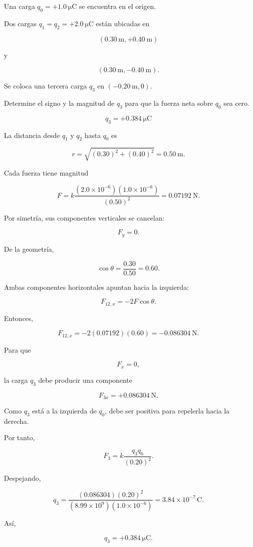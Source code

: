 \begin{ejercicio}
Una carga \(q_0=+\SI{1.0}{\micro\coulomb}\) se encuentra en el origen.

Dos cargas \(q_1=q_2=+\SI{2.0}{\micro\coulomb}\) están ubicadas en

\[
(\SI{0.30}{\metre},+\SI{0.40}{\metre})
\]

y

\[
(\SI{0.30}{\metre},-\SI{0.40}{\metre}).
\]

Se coloca una tercera carga \(q_3\) en
\((-\SI{0.20}{\metre},0)\).

Determine el signo y la magnitud de \(q_3\) para que la fuerza neta sobre
\(q_0\) sea cero.
\end{ejercicio}

\begin{respuesta}
\[
\boxed{q_3=+\SI{0.384}{\micro\coulomb}}
\]
\end{respuesta}

\begin{explicacion}
La distancia desde \(q_1\) y \(q_2\) hasta \(q_0\) es

\[
r=\sqrt{(0.30)^2+(0.40)^2}=\SI{0.50}{\metre}.
\]

Cada fuerza tiene magnitud

\[
F=k\frac{(2.0\times10^{-6})(1.0\times10^{-6})}{(0.50)^2}
=\SI{0.07192}{\newton}.
\]

Por simetría, sus componentes verticales se cancelan:

\[
F_y=0.
\]

De la geometría,

\[
\cos\theta=\frac{0.30}{0.50}=0.60.
\]

Ambas componentes horizontales apuntan hacia la izquierda:

\[
F_{12,x}=-2F\cos\theta.
\]

Entonces,

\[
F_{12,x}=-2(0.07192)(0.60)
=-\SI{0.086304}{\newton}.
\]

Para que

\[
F_x=0,
\]

la carga \(q_3\) debe producir una componente

\[
F_{3x}=+\SI{0.086304}{\newton}.
\]

Como \(q_3\) está a la izquierda de \(q_0\), debe ser positiva para repelerla
hacia la derecha.

Por tanto,

\[
F_3=k\frac{q_3q_0}{(0.20)^2}.
\]

Despejando,

\[
q_3=
\frac{(0.086304)(0.20)^2}
{(8.99\times10^9)(1.0\times10^{-6})}
=3.84\times10^{-7}\,\si{\coulomb}.
\]

Así,

\[
\boxed{q_3=+\SI{0.384}{\micro\coulomb}}.
\]
\end{explicacion}


